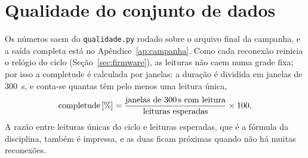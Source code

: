 \section{Qualidade do conjunto de dados}
\label{sec:qualidade}
\rubricaRobustez

Os números saem do \texttt{qualidade.py} rodado sobre o arquivo final da
campanha, e a saída completa está no Apêndice~\ref{ap:campanha}. Como
cada reconexão reinicia o relógio do ciclo (Seção~\ref{sec:firmware}), as
leituras não caem numa grade fixa; por isso a completude é calculada por
janelas: a duração é dividida em janelas de \SI{300}{\second}, e conta-se
quantas têm pelo menos uma leitura única,
\[
  \text{completude}\,[\%] = \frac{\text{janelas de \SI{300}{\second} com leitura}}
                                 {\text{leituras esperadas}} \times 100.
\]
A razão entre leituras únicas do ciclo e leituras esperadas, que é a
fórmula da disciplina, também é impressa, e as duas ficam próximas quando
não há muitas reconexões.

